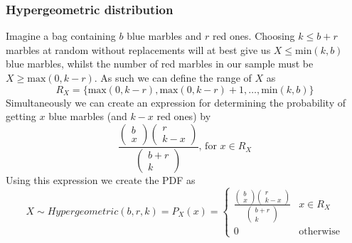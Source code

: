 \subsubsection{Hypergeometric distribution}
Imagine a bag containing $b$ blue marbles and $r$ red ones. Choosing $k\leq b+r$ marbles at random without replacements will at best give us $X\leq \text{min}(k,b)$ blue marbles, whilst the number of red marbles in our sample must be $X\geq \text{max}(0,k-r)$. As such we can define the range of $X$ as
\[
    R_X=\{\text{max}(0,k-r),\text{max}(0,k-r)+1,\ldots,\text{min}(k,b)\}
\]
Simultaneously we can create an expression for determining the probability of getting $x$ blue marbles (and $k-x$ red ones) by
\[
    \frac{\begin{pmatrix}b\\x\end{pmatrix}\begin{pmatrix}r\\k-x\end{pmatrix}}{\begin{pmatrix}b+r\\k\end{pmatrix}} \text{, for } x\in R_X
\]
Using this expression we create the PDF as
\[
    X\sim Hypergeometric(b,r,k)=P_{X}(x)=\begin{cases}\frac{\begin{pmatrix}b\\x\end{pmatrix}\begin{pmatrix}r\\k-x\end{pmatrix}}{\begin{pmatrix}b+r\\k\end{pmatrix}} & x\in R_X \\ 0 & \text{otherwise}\end{cases}
\]
